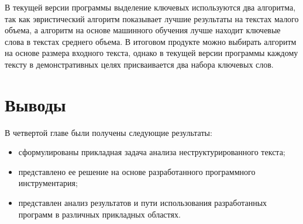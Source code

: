 В текущей версии программы выделение ключевых используются два алгоритма, так как эвристический алгоритм показывает лучшие результаты на текстах малого объема, а алгоритм на основе машинного обучения лучше находит ключевые слова в текстах среднего объема. В итоговом продукте можно выбирать алгоритм на основе размера входного текста, однако в текущей версии программы каждому тексту в демонстративных целях присваивается два набора ключевых слов. 

\section{Выводы}

В четвертой главе были получены следующие результаты:
\begin{itemize}
\item сформулированы прикладная задача анализа неструктурированного текста;
\item представлено ее решение на основе разработанного программного инструментария;
\item представлен анализ результатов и пути использования разработанных программ в различных прикладных областях. 
\end{itemize}
